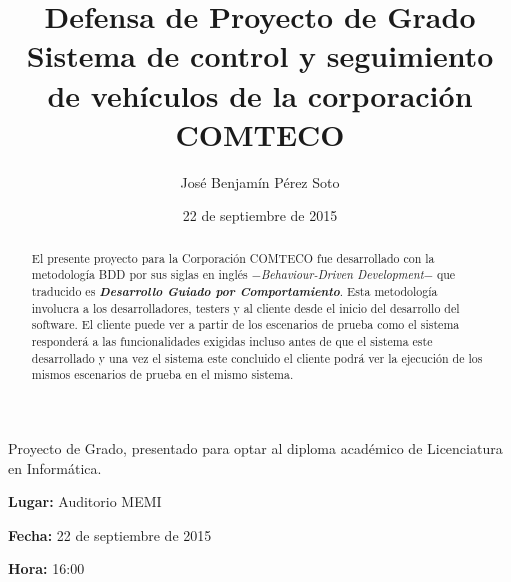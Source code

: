 \documentclass[letterpaper, 12pt]{article}
\begin{document}
\title{Defensa de Proyecto de Grado \\ Sistema de control y seguimiento de veh\'iculos de la corporaci\'on COMTECO}
\author{Jos\'e Benjam\'in P\'erez Soto}
\date{22 de septiembre de 2015}

\maketitle

\begin{center}
  Proyecto de Grado, presentado para optar al diploma acad\'emico de Licenciatura
en Inform\'atica.
\end{center}

{\bfseries Lugar:} Auditorio MEMI

{\bfseries Fecha:} 22 de septiembre de 2015

{\bfseries Hora:} 16:00

\begin{abstract}
  El presente proyecto para la Corporación COMTECO fue desarrollado con la
  metodología BDD por sus siglas en ingl\'es $-${\it Behaviour-Driven Development}$-$
  que traducido es {\it \bfseries Desarrollo Guiado por Comportamiento}. Esta
  metodología involucra a los desarrolladores, testers y al cliente desde el inicio
  del desarrollo del software. El cliente puede ver a partir de los escenarios de
  prueba como el sistema responderá a las funcionalidades exigidas incluso antes
  de que el sistema este desarrollado y una vez el sistema este concluido el cliente
  podrá ver la ejecución de los mismos escenarios de prueba en el mismo sistema.
\end{abstract}
\end{document}
